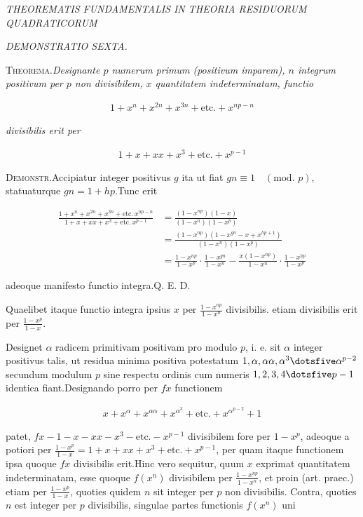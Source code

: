 %
\begin{center}
\textit{THEOREMATIS FUNDAMENTALIS IN THEORIA RESIDUORUM QUADRATICORUM}\par
\textit{DEMONSTRATIO SEXTA.}
\end{center}


\textsc{Theorema.}\quad \textit{Designante $p$ numerum primum (positivum imparem), $n$ integrum} \textit{positivum per $p$ non divisibilem, $x$ quantitatem indeterminatam, functio}

\[
\begin{aligned}
1+x^n+x^{2n}+x^{3n}+\text{etc.}+x^{np-n}
\end{aligned}
\]

\textit{divisibilis erit per}

\[
\begin{aligned}
1+x+xx+x^3+\text{etc.}+x^{p-1}
\end{aligned}
\]

\textsc{Demonstr.}\quad Accipiatur integer positivus $g$ ita ut fiat $gn\equiv1\quad(\text{mod. }p)$, statuaturque $gn=1+hp$.\quad Tunc erit

{\small
\[
\begin{aligned}
\frac{1+x^n+x^{2n}+x^{3n}+\text{etc.}\,x^{np-n}}{1+x+xx+x^3+\text{etc.}\,x^{p-1}} &=\frac{(1-x^{np})(1-x)}{(1-x^n)(1-x^p)}\\&=\frac{(1-x^{np})(1-x^{gn}-x+x^{hp+1})}{(1-x^n)(1-x^p)}\\
&=\frac{1-x^{np}}{1-x^p}\cdot\frac{1-x^{gn}}{1-x^n}-\frac{x(1-x^{np})}{1-x^n}\cdot\frac{1-x^{hp}}{1-x^p}
\end{aligned}
\]
}

adeoque manifesto functio integra.\quad Q. E. D.

Quaelibet itaque functio integra ipsius $x$ per $\frac{1-x^{np}}{1-x^n}$ divisibilis. etiam divisibilis erit per $\frac{1-x^p}{1-x}$.


Designet $\alpha$ radicem primitivam positivam pro modulo $p$, i. e. sit $\alpha$ integer positivus talis, ut residua minima positiva potestatum $1,\alpha,\alpha\alpha,\alpha^3\dotsfive\alpha^{p-2}$ secundum modulum $p$ sine respectu ordinis cum numeris $1,2,3,4\dotsfive p-1$ identica fiant.\quad Designando porro per $fx$ functionem

\[
\begin{aligned}
x+x^\alpha+x^{\alpha\alpha}+x^{\alpha^3}+\text{etc.}+x^{\alpha^{p-2}}+1
\end{aligned}
\]

patet, $fx-1- x-xx-x^3-\text{etc.}-x^{p-1}$ divisibilem fore per $1-x^p$, adeoque a potiori per $\frac{1-x^p}{1-x}=1+x+xx+x^3+\text{etc.}+x^{p-1}$, per quam itaque functionem ipsa quoque $fx$ divisibilis erit.\quad Hinc vero sequitur, quum $x$ exprimat quantitatem indeterminatam, esse quoque $f(x^n)$ divisibilem per $\frac{1-x^{np}}{1-x^n}$, et proin (art. praec.) etiam per $\frac{1-x^p}{1-x}$, quoties quidem $n$ sit integer per $p$ non divisibilis. Contra, quoties $n$ est integer per $p$ divisibilis, singulae partes functionis $f(x^n)$ uni%
